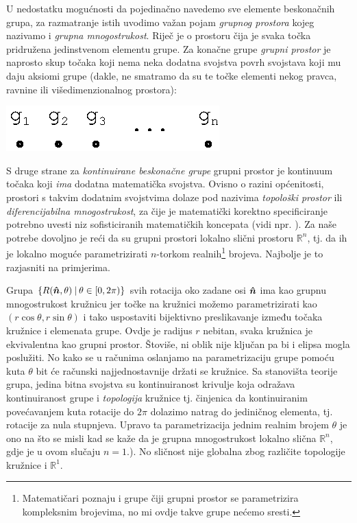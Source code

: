 U nedostatku mogućnosti da pojedinačno navedemo sve elemente beskonačnih
grupa, za razmatranje istih uvodimo važan pojam \emph{grupnog prostora}
kojeg nazivamo i \emph{grupna mnogostrukost}.
Riječ je o prostoru čija je svaka točka pridružena jedinstvenom
elementu grupe.
Za konačne grupe \emph{grupni prostor} je naprosto skup točaka koji
nema neka dodatna svojstva povrh svojstava koji mu daju aksiomi grupe
(dakle, ne smatramo da su te točke elementi nekog pravca, ravnine
ili višedimenzionalnog prostora):

\centerline{\includegraphics[scale=1.0]{pics/grupni_prostor.eps}}

S druge strane za \emph{kontinuirane beskonačne grupe} grupni prostor je
kontinuum točaka koji \emph{ima} dodatna matematička svojstva. 
Ovisno o razini općenitosti, prostori s takvim dodatnim svojstvima dolaze pod
nazivima \emph{topološki prostor} ili \emph{diferencijabilna mnogostrukost},
za čije je matematički korektno specificiranje potrebno uvesti
niz sofisticiranih matematičkih koncepata (vidi npr. 
\cite{Smolic:2024}). Za naše potrebe dovoljno je reći da su grupni
prostori lokalno slični prostoru $\mathbb{R}^n$,
tj. da ih je lokalno moguće parametrizirati $n$-torkom realnih\footnote{Matematičari
    poznaju i grupe čiji grupni prostor se parametrizira kompleksnim
    brojevima, no mi ovdje takve grupe nećemo sresti.}
brojeva. Najbolje je to razjasniti na primjerima.


Grupa $\{R(\unitn, \theta) \td \theta\in[0,2\pi)\}$ svih rotacija oko zadane osi
$\unitn$ ima kao grupnu mnogostrukost kružnicu jer točke na kružnici možemo parametrizirati
kao $(r\cos\theta, r\sin\theta)$ i tako uspostaviti bijektivno preslikavanje
između točaka kružnice i elemenata grupe. 
Ovdje je radijus $r$ nebitan, svaka kružnica je ekvivalentna kao
grupni prostor. Štoviše, ni oblik nije ključan pa bi i elipsa mogla poslužiti.
No kako se u računima oslanjamo na parametrizaciju grupe pomoću
kuta $\theta$ bit će računski najjednostavnije držati se kružnice.
Sa stanovišta teorije grupa, jedina bitna svojstva su kontinuiranost krivulje
koja odražava kontinuiranost grupe i \emph{topologija} kružnice tj. činjenica da 
kontinuiranim povećavanjem kuta rotacije do $2\pi$ dolazimo natrag do jediničnog
elementa, tj. rotacije za nula stupnjeva.
Upravo ta parametrizacija jednim realnim brojem $\theta$ je ono na što
se misli kad se kaže da je grupna mnogostrukost lokalno slična $\mathbb{R}^n$,
gdje je u ovom slučaju $n=1$.).
No sličnost nije globalna zbog različite topologije kružnice
i $\mathbb{R}^1$.


